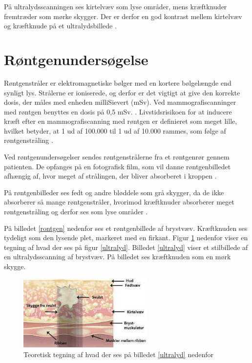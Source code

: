 På ultralydsscanningen ses kirtelvæv som lyse områder, mens kræftknuder fremtræder som mørke skygger. Der er derfor en god kontrast mellem kirtelvæv og kræftknude på et ultralydsbillede \cite{Ultralyd}.

\section{Røntgenundersøgelse}
Røntgenstråler er elektromagnetiske bølger med en kortere bølgelængde end synligt lys. Strålerne er ioniserede, og derfor er det vigtigt at give den korrekte dosis, der måles med enheden milliSievert (mSv). Ved mammografiscanninger med røntgen benyttes en dosis på 0,5 mSv. \cite{Sundhedsstyrelsen}. Livstidsrisikoen for at inducere kræft efter en mammografiscanning med røntgen er definieret som meget lille, hvilket betyder, at 1 ud af 100.000 til 1 ud af 10.000 rammes, som følge af røntgenstråling \cite{Risk}. 

Ved røntgenundersøgelser sendes røntgenstrålerne fra et røntgenrør gennem patienten. De opfanges på en fotografisk film, som vil danne røntgenbilledet afhængig af, hvor meget af strålingen, der bliver absorberet i kroppen \cite{Rontgenundersogelse}.

På røntgenbilleder ses fedt og andre bløddele som grå skygger, da de ikke absorberer så mange røntgenstråler, hvorimod kræftknuder absorberer meget røntgenstråling og derfor ses som lyse områder \cite{Rontgenundersogelse}.
\newpage

På billedet \ref{rontgen} nedenfor ses et røntgenbillede af brystvæv. Kræftknuden ses tydeligt som den lysende plet, markeret med en firkant. Figur \ref{teo} nedenfor viser en tegning af hvad der ses på figur \ref{ultralyd}. Billedet \ref{ultralyd} viser et stilbillede af en ultralydsscanning af brystvæv. På billedet ses kræftknuden som en mørk skygge. 

\begin{figure}[H]
  \centering
    \includegraphics[width=0.60\textwidth]{figurer/r/teori}
    \caption{Teoretisk tegning af hvad der ses på billedet \ref{ultralyd} nedenfor \cite{Ultralyd}}
    \label{teo}
\end{figure}

